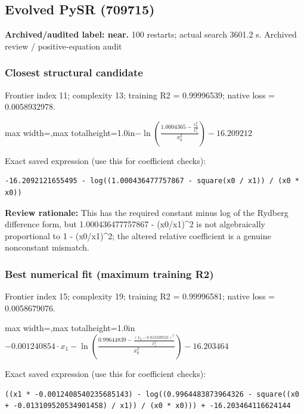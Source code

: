 \documentclass[10pt,letterpaper,landscape]{article}
\begin{document}
\begin{minipage}[t]{0.485\textwidth}
\subsection*{Evolved PySR (709715)}
\textbf{Archived/audited label: near.} 100 restarts; actual search 3601.2 s.
{\small Archived review / positive-equation audit}
\subsubsection*{Closest structural candidate}
Frontier index 11; complexity 13; training R2 = 0.99996539; native loss = 0.0058932978.
\begin{center}\begin{adjustbox}{max width=\linewidth,max totalheight=1.0in}$\displaystyle - \ln{\left(\frac{1.0004365 - \frac{x_{0}^{2}}{x_{1}^{2}}}{x_{0}^{2}} \right)} - 16.209212$\end{adjustbox}\end{center}
{\scriptsize Exact saved expression (use this for coefficient checks):}
\begin{lstlisting}
-16.2092121655495 - log((1.000436477757867 - square(x0 / x1)) / (x0 * x0))
\end{lstlisting}
{\small\textbf{Review rationale:} This has the required constant minus log of the Rydberg difference form, but 1.000436477757867 - (x0/x1)\textasciicircum{}2 is not algebraically proportional to 1 - (x0/x1)\textasciicircum{}2; the altered relative coefficient is a genuine nonconstant mismatch.}
\subsubsection*{Best numerical fit (maximum training R2)}
Frontier index 15; complexity 19; training R2 = 0.99996581; native loss = 0.0058679076.
\begin{center}\begin{adjustbox}{max width=\linewidth,max totalheight=1.0in}$\displaystyle - 0.001240854 \cdot x_{1} - \ln{\left(\frac{0.99644839 - \frac{\left(x_{0} - 0.013109521\right)^{2}}{x_{1}^{2}}}{x_{0}^{2}} \right)} - 16.203464$\end{adjustbox}\end{center}
{\scriptsize Exact saved expression (use this for coefficient checks):}
\begin{lstlisting}
((x1 * -0.0012408540235685143) - log((0.9964483873964326 - square((x0 + -0.013109520534901458) / x1)) / (x0 * x0))) + -16.203464116624144
\end{lstlisting}
\end{minipage}
\clearpage{}\label{rydberg-10008}
\end{document}
